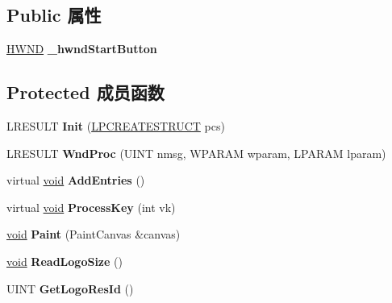 \subsection*{Public 属性}
\begin{DoxyCompactItemize}
\item 
\mbox{\label{struct_start_menu_root_ae23d35548b5174d067d73f2bfe8dcf12}} 
\hyperlink{interfacevoid}{H\+W\+ND} {\bfseries \+\_\+hwnd\+Start\+Button}
\end{DoxyCompactItemize}
\subsection*{Protected 成员函数}
\begin{DoxyCompactItemize}
\item 
\mbox{\label{struct_start_menu_root_a501aa635665e7003e7a868668aaada34}} 
L\+R\+E\+S\+U\+LT {\bfseries Init} (\hyperlink{structtag_c_r_e_a_t_e_s_t_r_u_c_t_a}{L\+P\+C\+R\+E\+A\+T\+E\+S\+T\+R\+U\+CT} pcs)
\item 
\mbox{\label{struct_start_menu_root_af93f1a00a428e67f032a55e21c90a292}} 
L\+R\+E\+S\+U\+LT {\bfseries Wnd\+Proc} (U\+I\+NT nmsg, W\+P\+A\+R\+AM wparam, L\+P\+A\+R\+AM lparam)
\item 
\mbox{\label{struct_start_menu_root_a20fd1890f0b018d70e0a3f9e3d7eda22}} 
virtual \hyperlink{interfacevoid}{void} {\bfseries Add\+Entries} ()
\item 
\mbox{\label{struct_start_menu_root_aaf031cbec701c7467853751caf575674}} 
virtual \hyperlink{interfacevoid}{void} {\bfseries Process\+Key} (int vk)
\item 
\mbox{\label{struct_start_menu_root_abbe12ee3425f99c1f4d9409b64d8f9f8}} 
\hyperlink{interfacevoid}{void} {\bfseries Paint} (Paint\+Canvas \&canvas)
\item 
\mbox{\label{struct_start_menu_root_a1ca14880e95f4520125a86f7af3c12b3}} 
\hyperlink{interfacevoid}{void} {\bfseries Read\+Logo\+Size} ()
\item 
\mbox{\label{struct_start_menu_root_a3261c8f80086d21531abc3a63a5cf083}} 
U\+I\+NT {\bfseries Get\+Logo\+Res\+Id} ()
\end{DoxyCompactItemize}
